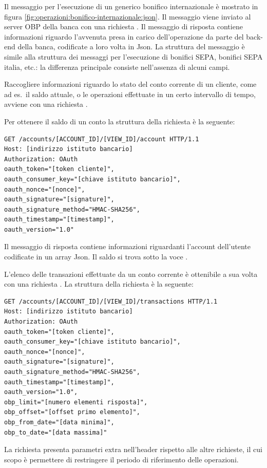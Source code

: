 Il messaggio per l'esecuzione di un generico bonifico internazionale \`e mostrato in figura \ref{fig:operazioni:bonifico-internazionale:json}.
Il messaggio viene inviato al server OBP della banca con una richiesta .
Il messaggio di risposta contiene informazioni riguardo l'avvenuta presa in carico dell'operazione da parte del back-end della banca, codificate a loro volta in Json.
La struttura del messaggio \`e simile alla struttura dei messaggi per l'esecuzione di bonifici SEPA, bonifici SEPA italia, etc.: la differenza principale consiste nell'assenza di alcuni campi.

Raccogliere informazioni riguardo lo stato del conto corrente di un cliente, come ad es.\ il saldo attuale, o le operazioni effettuate in un certo intervallo di tempo, avviene con una richiesta .

Per ottenere il saldo di un conto la struttura della richiesta \`e la seguente:
\begin{lstlisting}[basicstyle=\ttfamily]
GET /accounts/[ACCOUNT_ID]/[VIEW_ID]/account HTTP/1.1
Host: [indirizzo istituto bancario]
Authorization: OAuth
oauth_token="[token cliente]",
oauth_consumer_key="[chiave istituto bancario]",
oauth_nonce="[nonce]",
oauth_signature="[signature]",
oauth_signature_method="HMAC-SHA256",
oauth_timestamp="[timestamp]",
oauth_version="1.0"
\end{lstlisting}
Il messaggio di risposta contiene informazioni riguardanti l'account dell'utente codificate in un array Json.
Il saldo si trova sotto la voce .

L'elenco delle transazioni effettuate da un conto corrente \`e ottenibile a sua volta con una richiesta .
La struttura della richiesta \`e la seguente:
\begin{lstlisting}[basicstyle=\ttfamily]
GET /accounts/[ACCOUNT_ID]/[VIEW_ID]/transactions HTTP/1.1
Host: [indirizzo istituto bancario]
Authorization: OAuth
oauth_token="[token cliente]",
oauth_consumer_key="[chiave istituto bancario]",
oauth_nonce="[nonce]",
oauth_signature="[signature]",
oauth_signature_method="HMAC-SHA256",
oauth_timestamp="[timestamp]",
oauth_version="1.0",
obp_limit="[numero elementi risposta]",
obp_offset="[offset primo elemento]",
obp_from_date="[data minima]",
obp_to_date="[data massima]"
\end{lstlisting}
La richiesta presenta parametri extra nell'header rispetto alle altre richieste, il cui scopo \`e permettere di restringere il periodo di riferimento delle operazioni.

